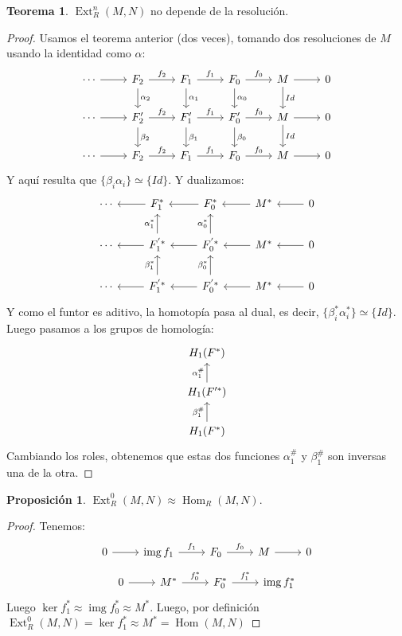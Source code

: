 \documentclass[spanish]{book}
\theoremstyle{definition}
\newtheorem*{teo}{Teorema}
\newtheorem*{prop}{Proposición}
\DeclareMathOperator{\img}{img}
\DeclareMathOperator{\Hom}{Hom}
\DeclareMathOperator{\Ext}{Ext}
\begin{document}
\begin{teo}
	$\Ext^n_R(M,N)$ no depende de la resolución.
\end{teo}
\begin{proof}
	Usamos el teorema anterior (dos veces), tomando dos resoluciones de $M$ usando la identidad como $\alpha$:
	\[\begin{tikzcd}
		\cdots\arrow[r]&F_2\arrow[r,"f_2"]\arrow[d,"\alpha_2"]&F_1\arrow[r,"f_1"]\arrow[d,"\alpha_1"]&F_0\arrow[d,"\alpha_0"]\arrow[r,"f_0"]&M\arrow[d,"Id"]\arrow[r]&0\\
		\cdots\arrow[r]&F'_2\arrow[r,"f_2"]\arrow[d,"\beta_2"]&F'_1\arrow[r,"f_1"]\arrow[d,"\beta_1"]&F'_0\arrow[d,"\beta_0"]\arrow[r,"f_0"]&M\arrow[d,"Id"]\arrow[r]&0\\
		\cdots\arrow[r]&F_2\arrow[r,"f_2"]&F_1\arrow[r,"f_1"]&F_0\arrow[r,"f_0"]&M\arrow[r]&0
	\end{tikzcd}\]
	Y aquí resulta que $\{\beta_i\alpha_i\}\simeq\{Id\}$. Y dualizamos:
	\[\begin{tikzcd}
		\cdots&F_1^*\arrow[l]&F_0^*\arrow[l]&M^*\arrow[l]&0\arrow[l]\\
		\cdots&F_1^{'*}\arrow[u,"\alpha_1^*"]\arrow[l]&F^{'*}_0\arrow[u,"\alpha_0^*"]\arrow[l]&M^*\arrow[l]&0\arrow[l]\\
		\cdots&F_1^{'*}\arrow[u,"\beta_1^*"]\arrow[l]&F^{'*}_0\arrow[u,"\beta_0^*"]\arrow[l]&M^*\arrow[l]&0\arrow[l]
	\end{tikzcd}\]
	Y como el funtor es aditivo, la homotopía pasa al dual, es decir, $\{\beta_i^*\alpha_i^*\}\simeq\{Id\}$. Luego pasamos a los grupos de homología:
	\[\begin{tikzcd}
		H_1(F^*)\\
		H_1(F'^*)\arrow[u,"\alpha_1^\#"]\\
		H_1(F^*)\arrow[u,"\beta_1^\#"]
	\end{tikzcd}\]
	Cambiando los roles, obtenemos que estas dos funciones $\alpha_1^\#$ y $\beta_1^\#$ son inversas una de la otra.
\end{proof}\vspace{-.3cm}
\begin{prop}
	$\Ext^0_R(M,N)\approx\Hom_R(M,N)$.
\end{prop}
\begin{proof} Tenemos:
	\[\begin{tikzcd}
		0\arrow[r]&\img f_1\arrow[r,"f_1"]&F_0\arrow[r,"f_0"]&M\arrow[r]&0
	\end{tikzcd}\]
	\[\begin{tikzcd}
		0\arrow[r]&M^*\arrow[r,"f_0^*"]&F^*_0\arrow[r,"f_1^*"]&\img f_1^*
	\end{tikzcd}\]
	Luego $\ker f_1^*\approx \img f_0^*\approx M^*$. Luego, por definición $\Ext^0_R(M,N)=\ker f_1^*\approx M^*=\Hom(M,N)$
\end{proof}
\end{document}
